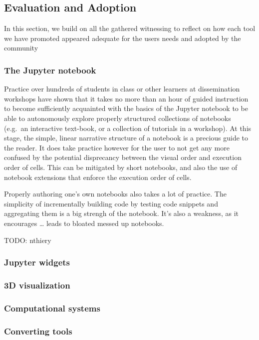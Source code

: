 \documentclass{deliverablereport}
\begin{document}
\subsection{Evaluation and Adoption}

In this section, we build on all the gathered witnessing to reflect on
how each tool we have promoted appeared adequate for the users needs and
adopted by the community

\subsubsection{The Jupyter notebook}

Practice over hundreds of students in class or other learners at
dissemination workshops have shown that it takes no more than an hour of
guided instruction to become sufficiently acquainted with the basics of
the Jupyter notebook to be able to autonomously explore properly
structured collections of notebooks (e.g.~an interactive text-book, or a
collection of tutorials in a workshop). At this stage, the simple,
linear narrative structure of a notebook is a precious guide to the
reader. It does take practice however for the user to not get any more
confused by the potential disprecancy between the visual order and
execution order of cells. This can be mitigated by short notebooks, and
also the use of notebook extensions that enforce the execution order of
cells.

Properly authoring one's own notebooks also takes a lot of practice. The
simplicity of incrementally building code by testing code snippets and
aggregating them is a big strengh of the notebook. It's also a weakness,
as it encourages \ldots{} leads to bloated messed up notebooks.

TODO: nthiery

\subsubsection{Jupyter widgets}

\subsubsection{3D visualization}

\subsubsection{Computational systems}

\subsubsection{Converting tools}
\end{document}
